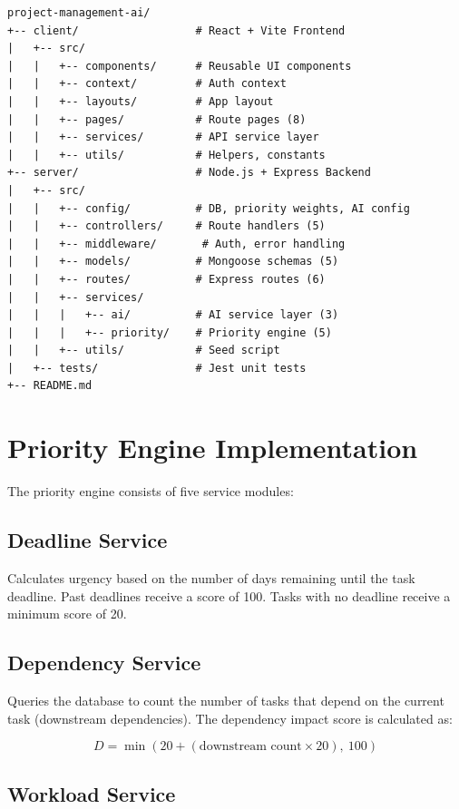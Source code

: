 \documentclass[12pt,a4paper,oneside]{report}
\begin{document}
\begin{lstlisting}[language={}, caption={Project Directory Structure}]
project-management-ai/
+-- client/                  # React + Vite Frontend
|   +-- src/
|   |   +-- components/      # Reusable UI components
|   |   +-- context/         # Auth context
|   |   +-- layouts/         # App layout
|   |   +-- pages/           # Route pages (8)
|   |   +-- services/        # API service layer
|   |   +-- utils/           # Helpers, constants
+-- server/                  # Node.js + Express Backend
|   +-- src/
|   |   +-- config/          # DB, priority weights, AI config
|   |   +-- controllers/     # Route handlers (5)
|   |   +-- middleware/       # Auth, error handling
|   |   +-- models/          # Mongoose schemas (5)
|   |   +-- routes/          # Express routes (6)
|   |   +-- services/
|   |   |   +-- ai/          # AI service layer (3)
|   |   |   +-- priority/    # Priority engine (5)
|   |   +-- utils/           # Seed script
|   +-- tests/               # Jest unit tests
+-- README.md
\end{lstlisting}

\section{Priority Engine Implementation}

The priority engine consists of five service modules:

\subsection{Deadline Service}

Calculates urgency based on the number of days remaining until the task deadline. Past deadlines receive a score of 100. Tasks with no deadline receive a minimum score of 20.

\subsection{Dependency Service}

Queries the database to count the number of tasks that depend on the current task (downstream dependencies). The dependency impact score is calculated as:

\begin{equation}
D = \min(20 + (\text{downstream count} \times 20),\ 100)
\end{equation}

\subsection{Workload Service}
\end{document}
